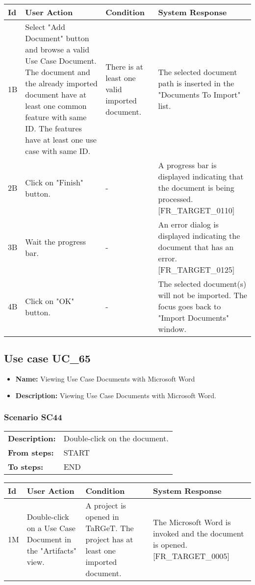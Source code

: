 \documentclass[a4paper,11pt]{article}
\newcommand{\bl}{\\ \hline}
\begin{document}
\begin{tabular}{|p{0.8in}|p{1.6in}|p{1.6in}|p{1.6in}|}
\hline
Id & User Action & Condition & System Response  \bl 
1B & Select "Add Document" button and browse a valid Use Case
						Document. The document and the already imported document have at
						least one common feature with same ID. The features have at least
						one use case with same ID. & There is at least one valid imported document.
					 & The selected document path is inserted in the "Documents
						To Import" list. \bl 
2B & Click on "Finish" button. & - & A progress bar is displayed indicating that the document
						is being processed. [FR_TARGET_0110] \bl 
3B & Wait the progress bar. & - & An error dialog is displayed indicating the document that
						has an error. [FR_TARGET_0125]  \bl 
4B & Click on "OK" button. & - & The selected document(s) will not be imported. The focus
						goes back to "Import Documents" window. \bl 
\end{tabular}
\subsection*{Use case UC_65}
\begin{itemize}
\item {\bf Name: }Viewing Use Case Documents with Microsoft Word
\item {\bf Description: } Viewing Use Case Documents with Microsoft Word.
			
\end{itemize}
\subsubsection*{Scenario SC44}
\begin{tabular}{p{1in}p{4in}}
{\bf Description:} & Double-click on the document. \\
{\bf From steps:} & START \\
{\bf To steps:} & END \\
\end{tabular}
 
\begin{tabular}{|p{0.8in}|p{1.6in}|p{1.6in}|p{1.6in}|}
\hline
Id & User Action & Condition & System Response  \bl 
1M & Double-click on a Use Case Document in the "Artifacts"
						view.  & A project is opened in TaRGeT. The project has at least
						one imported document. & The Microsoft Word is invoked and the document is opened.
						[FR_TARGET_0005] \bl 
\end{tabular}
\end{document}
